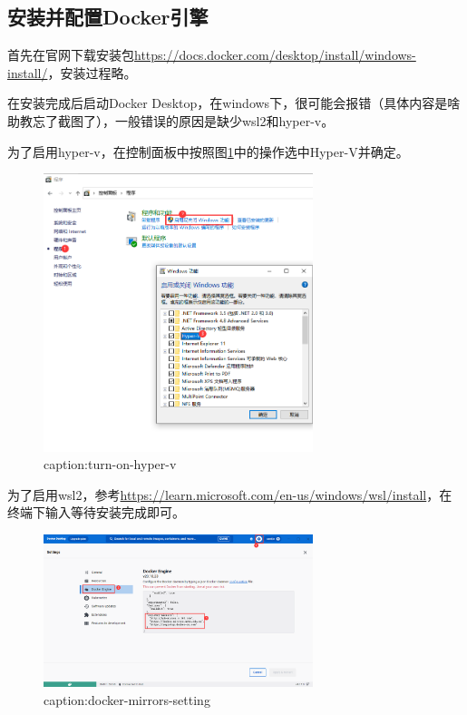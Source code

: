 \subsection{安装并配置Docker引擎}

首先在官网下载安装包\url{https://docs.docker.com/desktop/install/windows-install/}，安装过程略。

在安装完成后启动Docker Desktop，在windows下，很可能会报错（具体内容是啥助教忘了截图了），一般错误的原因是缺少wsl2和hyper-v。

为了启用hyper-v，在控制面板中按照图\ref{fig:turn-on-hyper-v}中的操作选中Hyper-V并确定。
\begin{figure}[htbp]
	\centering
	\includegraphics[width=0.7\textwidth]{figures/turn-on-hyper-v.png}
	\caption{caption:turn-on-hyper-v}
	\label{fig:turn-on-hyper-v}
\end{figure}

为了启用wsl2，参考\url{https://learn.microsoft.com/en-us/windows/wsl/install}，在终端下输入等待安装完成即可。

\begin{figure}[htbp]
	\centering
	\includegraphics[width=0.7\textwidth]{figures/docker-mirrors-setting.png}
	\caption{caption:docker-mirrors-setting}
	\label{fig:docker-mirrors-setting}
\end{figure}

